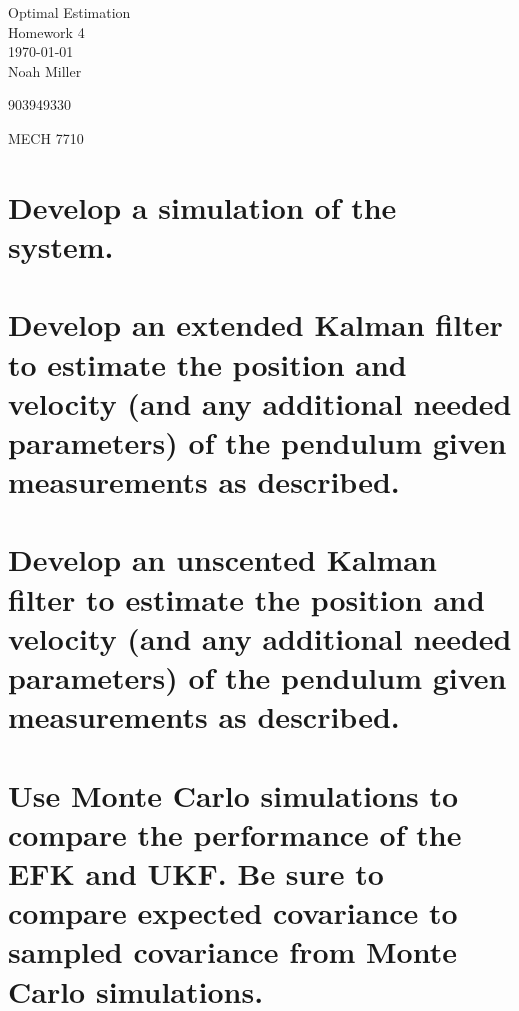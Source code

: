 \documentclass[12pt,letterpaper, onecolumn]{exam}
\begin{document}
\begingroup
\centering
\LARGE Optimal Estimation\\
\LARGE Homework 4 \\[0.5em]
\large \today\\[0.5em]
\large Noah Miller\par
\large 903949330\par
\large MECH 7710\par
\endgroup
\pointsdroppedatright   %
\printanswers
\renewcommand{\solution}{\noindent\textbf{Ans:}\enspace}   %
\vspace{.5cm}

\begin{questions}
    \begin{parts}
        \part{Develop a simulation of the system.}

        \part{Develop an extended Kalman filter to estimate the position and velocity (and any additional needed parameters) of the pendulum given measurements as described.}

        \part{Develop an unscented Kalman filter to estimate the position and velocity (and any additional needed parameters) of the pendulum given measurements as described.}

        \part{Use Monte Carlo simulations to compare the performance of the EFK and UKF. Be sure to compare expected covariance to sampled covariance from Monte Carlo simulations.}
    \end{parts}


\end{questions}
\end{document}
